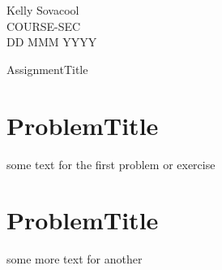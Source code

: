\documentclass[12pt]{article}
\begin{document}
\begin{flushleft}
Kelly Sovacool\\
COURSE-SEC\\ 
DD MMM YYYY\\
\end{flushleft}

\begin{center}
\LARGE{AssignmentTitle}
\end{center}

\section{ProblemTitle}
some text for the first problem or exercise

\section{ProblemTitle}
some more text for another
\end{document}
